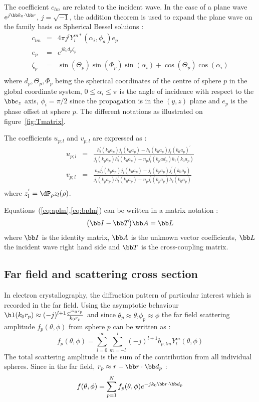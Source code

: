 The coefficient $c_{lm}$ are related to the incident wave.
In the case of a plane wave $e^{j\bb k_0\cdot\bb r}$, $j=\sqrt{-1}$,
the addition theorem is used to expand the plane wave on
the family basis os Spherical Bessel soluions :
\begin{eqnarray*}
  c_{lm}  &=& 4\pi j^l Y_l^{m*}\left(\alpha_i,\phi_a\right)e_p\\
  e_p     &=& e^{jk_0d_p\zeta_p}\\
  \zeta_p &=& \sin(\Theta_p)\sin(\Phi_p)\sin(\alpha_i)+
              \cos(\Theta_p)\cos(\alpha_i)\\
\end{eqnarray*}
%
where $d_p,\Theta_p,\Phi_p$ being the spherical coordinates of the
centre of sphere $p$ in the global coordinate system,
$0\le\alpha_i\le\pi$ is the angle of incidence with respect to
the $\bb e_z$ axis, $\phi_i=\pi/2$ since the propagation is in the $(y,z)$
plane and $e_p$ is the phase offset at sphere $p$.
The different notations as illustrated on figure~\ref{fig:Tmatrix}.

The coefficients $u_{p;l}$ and $v_{p;l}$ are expressed as :
\begin{eqnarray*}
  u_{p;l} &=& \frac{h_l^{'}(k_0a_p)j_l(k_0a_p) - h_l(k_0a_p)j_l(k_0a_p)^{'}}
    {j_l(k_pa_p)h_l^{'}(k_0a_p)-n_pj_l^{'}(k_pad_p)h_l(k_0a_p)} \\
  v_{p;l} &=& \frac{n_pj_l^{'}(k_pa_p)j_l(k_0a_p) - j_l(k_pa_p)j_l^{'}(k_0a_p)}
    {j_l(k_pa_p)h_l^{'}(k_0a_p)-n_pj_l^{'}(k_pa_p)h_l(k_0a_p)} \\
\end{eqnarray*}
%
where $z_l^{'}=\dP_{\rho}z_l(\rho)$.

Equations~(\ref{eq:aplm},\ref{eq:bplm}) can be written in a matrix notation :
%
\begin{equation}\label{eq:Tsystem}
  \big(\bb I - \bb T \big)\bb A = \bb L
\end{equation}
%
where
$\bb I$ is the identity matrix,
$\bb A$ is the unknown vector coefficients,
$\bb L$ the incident wave right hand side and
$\bb T$ is the cross-coupling matrix.


\subsection{Far field and scattering cross section}
In electron crystallography, the diffraction pattern of particular
interest which is recorded in the far field. Using the asymptotic
behaviour $\hl(k_0r_p)\approx (-j)^{l+1}\frac{e^{jk_0r_p}}{k_0r_p}$
and since $\theta_p\approx\theta$,$\phi_p\approx\phi$
the far field scattering amplitude $f_p(\theta,\phi)$ from sphere $p$ can
be written as :
%
\begin{equation}\label{eq:fp_theta}
  f_p(\theta,\phi) = \sum_{l=0}^{\infty}\sum_{m=-l}^{l} (-j)^{l+1}b_{p;lm}Y_l^m(\theta,\phi)
\end{equation}
%
The total scattering amplitude is the sum of the contribution from all
individual spheres.
Since in the far field, $r_p\approx r-\bb r\cdot\bb d_p$ :
%
\begin{equation}\label{eq:f_theta}
  f(\theta,\phi) = \sum_{p=1}^{N} f_p(\theta,\phi)e^{-jk_0\bb r\cdot\bb d_p}
\end{equation}
%

